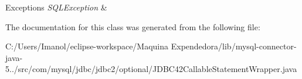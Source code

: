 \begin{DoxyExceptions}{Exceptions}
{\em S\+Q\+L\+Exception} & \\
\hline
\end{DoxyExceptions}


The documentation for this class was generated from the following file\+:\begin{DoxyCompactItemize}
\item 
C\+:/\+Users/\+Imanol/eclipse-\/workspace/\+Maquina Expendedora/lib/mysql-\/connector-\/java-\/5../src/com/mysql/jdbc/jdbc2/optional/J\+D\+B\+C42\+Callable\+Statement\+Wrapper.\+java\end{DoxyCompactItemize}
